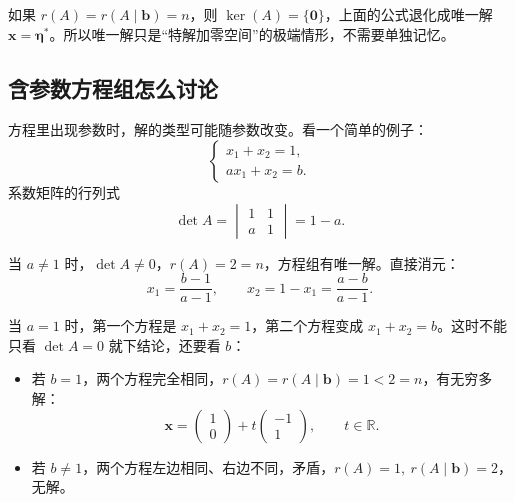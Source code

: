 如果 \(r(A)=r(A\mid \bm{b})=n\)，则 \(\ker(A)=\{\bm{0}\}\)，上面的公式退化成唯一解 \(\bm{x}=\bm{\eta}^*\)。所以唯一解只是“特解加零空间”的极端情形，不需要单独记忆。

\subsection{含参数方程组怎么讨论}

方程里出现参数时，解的类型可能随参数改变。看一个简单的例子：
\[
\begin{cases}
x_1+x_2=1,\\
ax_1+x_2=b.
\end{cases}
\]
系数矩阵的行列式
\[
\det A=\begin{vmatrix}1&1\\a&1\end{vmatrix}=1-a.
\]

当 \(a\neq 1\) 时，\(\det A\neq 0\)，\(r(A)=2=n\)，方程组有唯一解。直接消元：
\[
x_1=\frac{b-1}{a-1},\qquad
x_2=1-x_1=\frac{a-b}{a-1}.
\]

当 \(a=1\) 时，第一个方程是 \(x_1+x_2=1\)，第二个方程变成 \(x_1+x_2=b\)。这时不能只看 \(\det A=0\) 就下结论，还要看 \(b\)：
\begin{itemize}
    \item 若 \(b=1\)，两个方程完全相同，\(r(A)=r(A\mid \bm{b})=1<2=n\)，有无穷多解：
    \[
    \bm{x}=\begin{pmatrix}1\\0\end{pmatrix}+t\begin{pmatrix}-1\\1\end{pmatrix},
    \qquad t\in\mathbb{R}.
    \]
    \item 若 \(b\neq 1\)，两个方程左边相同、右边不同，矛盾，\(r(A)=1,\ r(A\mid \bm{b})=2\)，无解。
\end{itemize}

